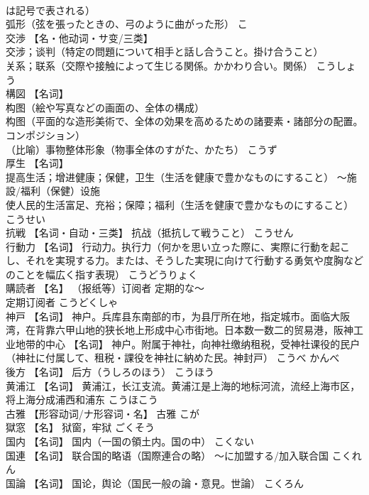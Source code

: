 \documentclass[8pt]{extreport}
\begin{document}
\begin{CJK}{UTF8}{min}
\\	は記号で表される） 
\\	弧形（弦を張ったときの、弓のように曲がった形）	こ	
\\	交渉	【名・他动词・サ变/三类】 
\\	交涉；谈判（特定の問題について相手と話し合うこと。掛け合うこと） 
\\	关系；联系（交際や接触によって生じる関係。かかわり合い。関係）	こうしょう	
\\	構図	【名词】 
\\	构图（絵や写真などの画面の、全体の構成） 
\\	构图（平面的な造形美術で、全体の効果を高めるための諸要素・諸部分の配置。コンポジション） 
\\	（比喻）事物整体形象（物事全体のすがた、かたち）	こうず	
\\	厚生	【名词】 
\\	提高生活；增进健康；保健，卫生（生活を健康で豊かなものにすること） ～施設/福利（保健）设施 
\\	使人民的生活富足、充裕；保障；福利（生活を健康で豊かなものにすること）	こうせい	
\\	抗戦	【名词・自动・三类】 抗战（抵抗して戦うこと）	こうせん	
\\	行動力	【名词】 行动力。执行力（何かを思い立った際に、実際に行動を起こし、それを実現する力。または、そうした実現に向けて行動する勇気や度胸などのことを幅広く指す表現）	こうどうりょく	
\\	購読者	【名】 （报纸等）订阅者 定期的な～ 
\\	定期订阅者	こうどくしゃ	
\\	神戸	【名词】 神户。兵库县东南部的市，为县厅所在地，指定城市。面临大阪湾，在背靠六甲山地的狭长地上形成中心市街地。日本数一数二的贸易港，阪神工业地带的中心 【名词】 神户。附属于神社，向神社缴纳租税，受神社课役的民户（神社に付属して、租税・課役を神社に納めた民。神封戸）	こうべ かんべ	
\\	後方	【名词】 后方（うしろのほう）	こうほう	
\\	黄浦江	【名词】 黄浦江，长江支流。黄浦江是上海的地标河流，流经上海市区，将上海分成浦西和浦东	こうほこう	
\\	古雅	【形容动词/ナ形容词・名】 古雅	こが	
\\	獄窓	【名】 狱窗，牢狱	ごくそう	
\\	国内	【名词】 国内（一国の領土内。国の中）	こくない	
\\	国連	【名词】 联合国的略语（国際連合の略） ～に加盟する/加入联合国	こくれん	
\\	国論	【名词】 国论，舆论（国民一般の論・意見。世論）	こくろん	

\end{CJK}
\end{document}
